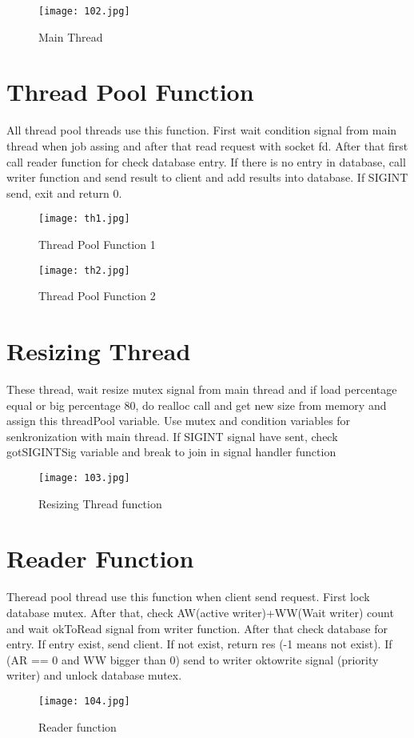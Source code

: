 \documentclass{article}
\begin{document}
\begin{figure}[h!] 
    \centering
    \texttt{[image: 102.jpg]}
    \caption{Main Thread}
\end{figure}

\section{Thread Pool Function}
	All thread pool threads use this function. First wait condition signal from main thread when job assing and after that read request with socket fd. After that first call reader function for check database entry. If there is no entry in database, call writer function and send result to client and add results into database. If SIGINT send, exit and return 0.

\begin{figure}[h!] 
    \centering
    \texttt{[image: th1.jpg]}
    \caption{Thread Pool Function 1}
\end{figure}
\begin{figure}[h!] 
    \centering
    \texttt{[image: th2.jpg]}
    \caption{Thread Pool Function 2}
\end{figure}
\newpage
\section{Resizing Thread}
These thread, wait resize mutex signal from main thread and if load percentage equal or big percentage 80, do realloc call and get new size from memory and assign this threadPool variable. Use mutex and condition variables for senkronization with main thread. If SIGINT signal have sent, check gotSIGINTSig variable and break to join in signal handler function
\begin{figure}[h!] 
    \centering
    \texttt{[image: 103.jpg]}
    \caption{Resizing Thread function}
\end{figure}

\section{Reader Function}
Theread pool thread use this function when client send request. First lock database mutex. After that, check AW(active writer)+WW(Wait writer) count and wait okToRead signal from writer function. After that check database for entry. If entry exist, send client. If not exist, return res (-1 means not exist). If (AR == 0 and WW bigger than 0) send to writer oktowrite signal (priority writer) and unlock database mutex.
\begin{figure}[h!] 
    \centering
    \texttt{[image: 104.jpg]}
    \caption{Reader function}
\end{figure}
\newpage
\end{document}
